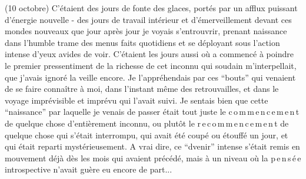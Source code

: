 (10 octobre) C'étaient des jours de fonte des glaces, portés par un afflux puissant d'énergie nouvelle - des jours de travail intérieur et d'émerveillement devant ces mondes nouveaux que jour après jour je voyais s'entrouvrir, prenant naissance dans l'humble trame des menus faits quotidiens et se déployant sous l'action intense d'yeux avides de voir. C'étaient les jours aussi où a commencé à poindre le premier pressentiment de la richesse de cet inconnu qui soudain m'interpellait, que j'avais ignoré la veille encore. Je l'appréhendais par ces ``bouts'' qui venaient de se faire connaître à moi, dans l'instant même des retrouvailles, et dans le voyage imprévisible et imprévu qui l'avait suivi. Je sentais bien que cette ``naissance'' par laquelle je venais de passer était tout juste le c\,o\,m\,m\,e\,n\,c\,e\,m\,e\,n\,t de quelque chose d'entièrement inconnu, ou plutôt le r\,e\,c\,o\,m\,m\,e\,n\,c\,e\,m\,e\,n\,t de quelque chose qui s'était interrompu, qui avait été coupé ou étouffé un jour, et qui était reparti mystérieusement. A vrai dire, ce ``dvenir'' intense s'était remis en mouvement déjà dès les mois qui avaient précédé, mais à un niveau où la p\,e\,n\,s\,é\,e introspective n'avait guère eu encore de part...

